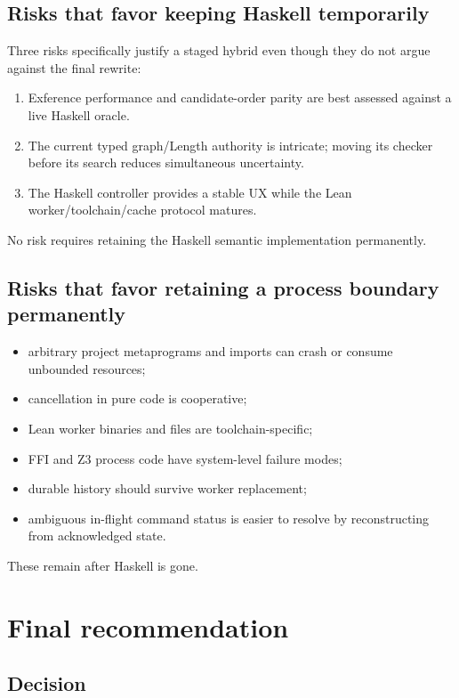 \documentclass[10pt,letterpaper,oneside]{report}
\newcommand{\code}[1]{\texttt{\detokenize{#1}}}
\begin{document}
\section{Risks that favor keeping Haskell temporarily}

Three risks specifically justify a staged hybrid even though they do not argue against the final rewrite:

\begin{enumerate}
  \item Exference performance and candidate-order parity are best assessed against a live Haskell oracle.
  \item The current typed graph/Length authority is intricate; moving its checker before its search reduces simultaneous uncertainty.
  \item The Haskell controller provides a stable UX while the Lean worker/toolchain/cache protocol matures.
\end{enumerate}

No risk requires retaining the Haskell semantic implementation permanently.

\section{Risks that favor retaining a process boundary permanently}

\begin{itemize}
  \item arbitrary project metaprograms and imports can crash or consume unbounded resources;
  \item cancellation in pure code is cooperative;
  \item Lean worker binaries and \code{.olean} files are toolchain-specific;
  \item FFI and Z3 process code have system-level failure modes;
  \item durable history should survive worker replacement;
  \item ambiguous in-flight command status is easier to resolve by reconstructing from acknowledged state.
\end{itemize}

These remain after Haskell is gone.

\chapter{Final recommendation}\label{ch:recommendation}

\section{Decision}
\end{document}
